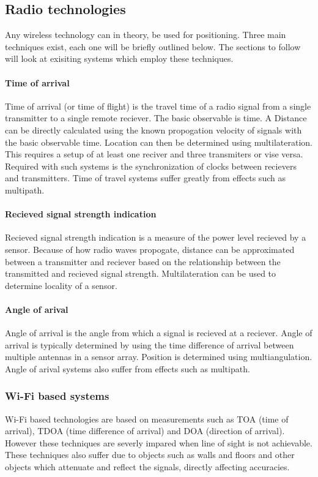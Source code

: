 \documentclass[11pt,a4paper]{article}
\begin{document}
	\subsection{Radio technologies}
		Any wireless technology can in theory, be used for positioning. Three main techniques exist, each one will be briefly outlined below. The sections to follow will look at exisiting systems which employ these techniques.
	
	\paragraph{Time of arrival}
		Time of arrival (or time of flight) is the travel time of a radio signal from a single transmitter to a single remote reciever. The basic observable is time. A Distance can be directly calculated using the known propogation velocity of signals with the basic observable time. Location can then be determined using multilateration. This requires a setup of at least one reciver and three transmiters or vise versa.
		Required with such systems is the synchronization of clocks between recievers and transmitters.
		Time of travel systems suffer greatly from effects such as multipath.
		\cite{k._pahlavan_wideband_1998}
	
	\paragraph{Recieved signal strength indication}
		Recieved signal strength indication is a measure of the power level recieved by a sensor. Because of how radio waves propogate, distance can be approximated between a transmitter and reciever based on the relationship between the transmitted and recieved signal strength. Multilateration can be used to determine locality of a sensor.
	
	\paragraph{Angle of arival}
		Angle of arrival is the angle from which a signal is recieved at a reciever. Angle of arrival is typically determined by using the time difference of arrival between multiple antennas in a sensor array. Position is determined using multiangulation.
		Angle of arival systems also suffer from effects such as multipath.
	
	\subsubsection{Wi-Fi based systems}
		Wi-Fi based technologies are based on measurements such as TOA (time of arrival), TDOA (time difference of arrival) and DOA (direction of arrival). However these techniques are severly impared when line of sight is not achievable. These techniques also suffer due to objects such as walls and floors and other objects which attenuate and reflect the signals, directly affecting accuracies.
	
\end{document}
